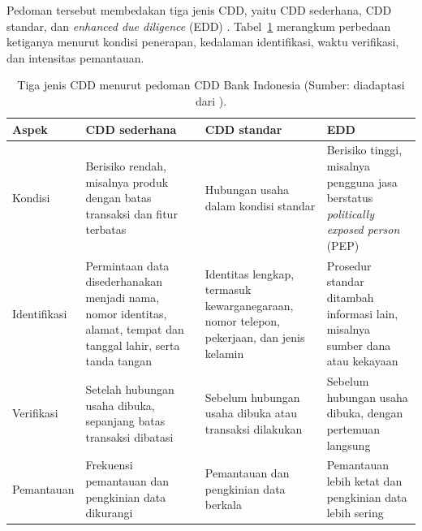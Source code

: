 Pedoman tersebut membedakan tiga jenis CDD, yaitu CDD sederhana, CDD standar, dan \textit{enhanced due diligence} (EDD) \cite[hlm.~6]{bi2023pedoman}. Tabel~\ref{tab:ch2-cdd-tiga-jenis} merangkum perbedaan ketiganya menurut kondisi penerapan, kedalaman identifikasi, waktu verifikasi, dan intensitas pemantauan.

\begin{table}[H]
    \caption[Tiga jenis CDD menurut pedoman CDD Bank Indonesia.]{Tiga jenis CDD menurut pedoman CDD Bank Indonesia (Sumber: diadaptasi dari \cite[hlm.~7]{bi2023pedoman}).}
    \label{tab:ch2-cdd-tiga-jenis}
    \centering
    \small
    \begin{tabular}{@{}>{\raggedright\arraybackslash}p{2.1cm}>{\raggedright\arraybackslash}p{3.7cm}>{\raggedright\arraybackslash}p{3.5cm}>{\raggedright\arraybackslash}p{3.7cm}@{}}
        \toprule
        \textbf{Aspek} & \textbf{CDD sederhana} & \textbf{CDD standar} & \textbf{EDD} \\
        \midrule
        Kondisi & Berisiko rendah, misalnya produk dengan batas transaksi dan fitur terbatas & Hubungan usaha dalam kondisi standar & Berisiko tinggi, misalnya pengguna jasa berstatus \textit{politically exposed person} (PEP) \\
        Identifikasi & Permintaan data disederhanakan menjadi nama, nomor identitas, alamat, tempat dan tanggal lahir, serta tanda tangan & Identitas lengkap, termasuk kewarganegaraan, nomor telepon, pekerjaan, dan jenis kelamin & Prosedur standar ditambah informasi lain, misalnya sumber dana atau kekayaan \\
        Verifikasi & Setelah hubungan usaha dibuka, sepanjang batas transaksi dibatasi & Sebelum hubungan usaha dibuka atau transaksi dilakukan & Sebelum hubungan usaha dibuka, dengan pertemuan langsung \\
        Pemantauan & Frekuensi pemantauan dan pengkinian data dikurangi & Pemantauan dan pengkinian data berkala & Pemantauan lebih ketat dan pengkinian data lebih sering \\
        \bottomrule
    \end{tabular}
\end{table}


